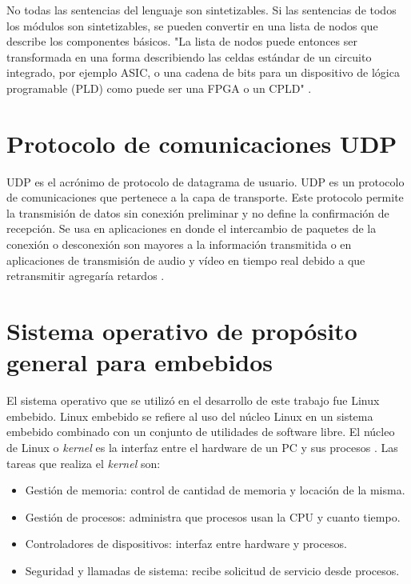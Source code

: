 No todas las sentencias del lenguaje son sintetizables. Si las sentencias de todos los módulos son sintetizables, se pueden convertir en una lista de nodos que describe los componentes básicos. "La lista de nodos puede entonces ser transformada en una forma describiendo las celdas estándar de un circuito integrado, por ejemplo ASIC, o una cadena de bits para un dispositivo de lógica programable (PLD) como puede ser una FPGA o un CPLD"  \citep{WIKIVERILOG}.




\section{Protocolo de comunicaciones UDP}
UDP es el acrónimo de protocolo de datagrama de usuario. UDP es un protocolo de comunicaciones que pertenece a la capa de transporte. Este protocolo permite la transmisión de datos sin conexión preliminar y no define la confirmación de recepción. Se usa en aplicaciones en donde el intercambio de paquetes de la conexión o desconexión son mayores a la información transmitida o en aplicaciones de transmisión de audio y vídeo en tiempo real debido a que retransmitir agregaría retardos \citep{WIKIUDP}.


\section{Sistema operativo de propósito general para embebidos}

El sistema operativo que se utilizó en el desarrollo de este trabajo fue Linux embebido. Linux embebido se refiere al uso del núcleo Linux  en un sistema embebido combinado con un conjunto de utilidades de software libre. 
El núcleo de Linux o \textit{kernel} es la interfaz entre el hardware de un PC y sus procesos \citep{KERNEL}. Las tareas que realiza el \textit{kernel} son:

\begin{itemize}
\item Gestión de memoria: control de cantidad de memoria y locación de la misma.
\item Gestión de procesos: administra que procesos usan la CPU y cuanto tiempo.
\item Controladores de dispositivos: interfaz entre hardware y procesos.
\item Seguridad y llamadas de sistema: recibe solicitud de servicio desde procesos. 
\end{itemize}


